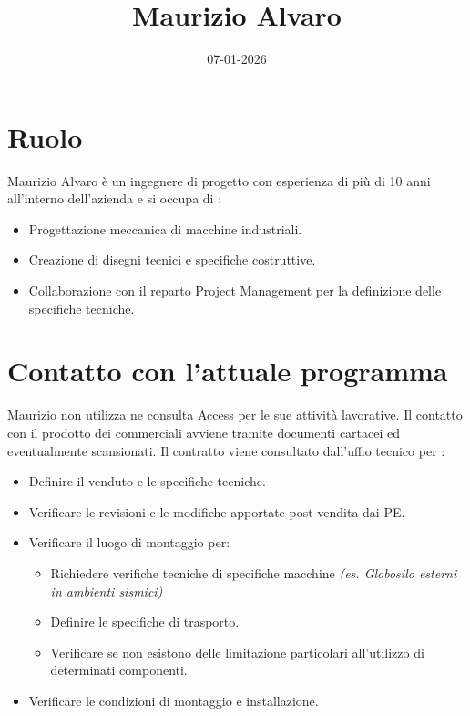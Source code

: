 \documentclass[12pt, a4paper]{article} %
\title{Maurizio Alvaro}
\date{07-01-2026}
\begin{document}
\maketitle

\section{Ruolo}
Maurizio Alvaro è un ingegnere di progetto con esperienza di più di 10 anni
all'interno dell'azienda e si occupa di :
\begin{itemize}
    \item Progettazione meccanica di macchine industriali.
    \item Creazione di disegni tecnici e specifiche costruttive.
    \item Collaborazione con il reparto Project Management per la definizione delle
          specifiche tecniche.
\end{itemize}

\section{Contatto con l'attuale programma}
Maurizio non utilizza ne consulta Access per le sue attività lavorative. Il
contatto con il prodotto dei commerciali avviene tramite documenti cartacei ed
eventualmente scansionati. Il contratto viene consultato dall'uffio tecnico per
:
\begin{itemize}
    \item Definire il venduto e le specifiche tecniche.
    \item Verificare le revisioni e le modifiche apportate post-vendita dai PE.
    \item Verificare il luogo di montaggio per:
          \begin{itemize}
              \item Richiedere verifiche tecniche di specifiche macchine \textit{(es. Globosilo
                        esterni in ambienti sismici)}
              \item Definire le specifiche di trasporto.
              \item Verificare se non esistono delle limitazione particolari all'utilizzo di
                    determinati componenti.
          \end{itemize}
    \item Verificare le condizioni di montaggio e installazione.
\end{itemize}
\end{document}
